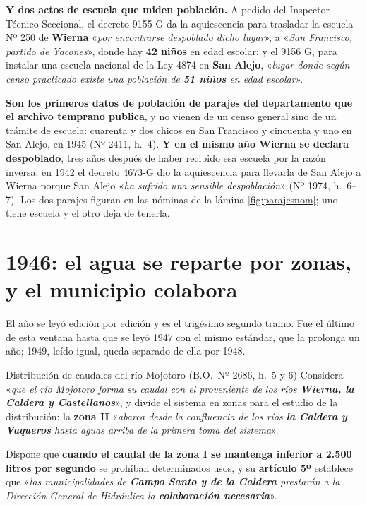 \begin{cautela}
\textbf{Y dos actos de escuela que miden población.} A pedido del Inspector Técnico
Seccional, el decreto 9155 G da la aquiescencia para trasladar la escuela Nº 250 de
\textbf{Wierna} «\textit{por encontrarse despoblado dicho lugar}», a «\textit{San Francisco,
partido de Yacones}», donde hay \textbf{42 niños} en edad escolar; y el 9156 G, para instalar una
escuela nacional de la Ley 4874 en \textbf{San Alejo}, «\textit{lugar donde
según censo practicado existe una población de \textbf{51 niños} en edad
escolar}».

\textbf{Son los primeros datos de población de parajes del departamento que el
archivo temprano publica}, y no vienen de un censo general sino de un trámite de
escuela: cuarenta y dos chicos en San Francisco y cincuenta y uno en San Alejo, en 1945
(Nº 2411, h.\ 4). \textbf{Y en el mismo año
Wierna se declara despoblado}, tres años después de haber recibido esa escuela
por la razón inversa: en 1942 el decreto 4673-G dio la aquiescencia para llevarla de San Alejo a Wierna porque
San Alejo «\textit{ha sufrido una sensible despoblación}» (Nº 1974, h.\ 6--7). Los dos parajes figuran en las nóminas de la
lámina \ref{fig:parajesnom}; uno tiene escuela y el otro deja de tenerla.
\end{cautela}

\section{1946: el agua se reparte por zonas, y el municipio colabora}

El año se leyó edición por edición y es el trigésimo segundo tramo. Fue el último de
esta ventana hasta que se leyó 1947 con el mismo estándar, que la prolonga un año; 1949, leído igual, queda separado de ella por 1948.

\begin{ficha}{Distribución de caudales del río Mojotoro (B.O.\ Nº 2686, h.\ 5 y 6)}
Considera «\textit{que el río Mojotoro forma su caudal con el proveniente de los
ríos \textbf{Wierna, la Caldera y Castellanos}}», y divide el sistema en zonas
para el estudio de la distribución: la \textbf{zona II} «\textit{abarca desde la
confluencia de los ríos \textbf{la Caldera y Vaqueros} hasta aguas arriba de la
primera toma del sistema}».

Dispone que \textbf{cuando el caudal de la zona I se mantenga inferior a
\textbf{2.500 litros por segundo}} se prohíban determinados usos, y su
\textbf{artículo 5º} establece que «\textit{las municipalidades de \textbf{Campo
Santo y de la Caldera} prestarán a la Dirección General de Hidráulica la
\textbf{colaboración necesaria}}».
\end{ficha}

